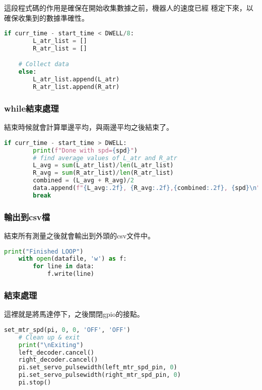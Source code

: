這段程式碼的作用是確保在開始收集數據之前，機器人的速度已經
穩定下來，以確保收集到的數據準確性。
\begin{lstlisting}[language=Python, caption=紀錄轉速]
    if curr_time - start_time < DWELL/8:
        L_atr_list = []
        R_atr_list = []

    # Collect data
    else:
        L_atr_list.append(L_atr)
        R_atr_list.append(R_atr)
\end{lstlisting}
\subsubsection{while結束處理}
結束時候就會計算單邊平均，與兩邊平均之後結束了。
\begin{lstlisting}[language=Python, caption=紀錄轉速]
    if curr_time - start_time > DWELL:
        print(f"Done with spd={spd}")
        # find average values of L_atr and R_atr
        L_avg = sum(L_atr_list)/len(L_atr_list)
        R_avg = sum(R_atr_list)/len(R_atr_list)
        combined = (L_avg + R_avg)/2
        data.append(f"{L_avg:.2f}, {R_avg:.2f},{combined:.2f}, {spd}\n")
        break
\end{lstlisting}

\subsubsection{輸出到csv檔}
結束所有測量之後就會輸出到外頭的csv文件中。
\begin{lstlisting}[language=Python, caption=紀錄資料]
  print("Finished LOOP")
    with open(datafile, 'w') as f:
        for line in data:
            f.write(line)
\end{lstlisting}


\subsubsection{結束處理}
這裡就是將馬達停下，之後關閉gpio的接點。
\begin{lstlisting}[language=Python, caption=紀錄資料]
    set_mtr_spd(pi, 0, 0, 'OFF', 'OFF')
    # Clean up & exit
    print("\nExiting")
    left_decoder.cancel()
    right_decoder.cancel()
    pi.set_servo_pulsewidth(left_mtr_spd_pin, 0)
    pi.set_servo_pulsewidth(right_mtr_spd_pin, 0)
    pi.stop()
\end{lstlisting}


